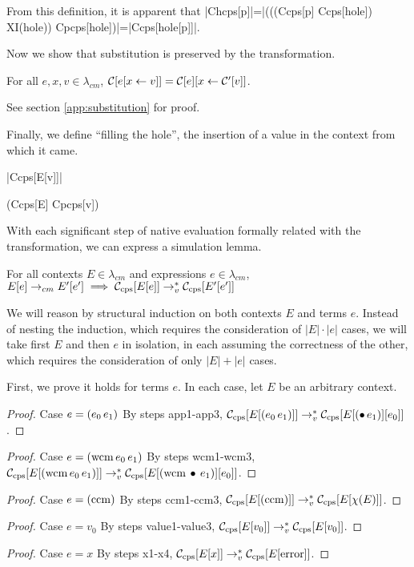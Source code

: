 From this definition, it is apparent that \scheme|Chcps[p]|=\scheme|(((Ccps[p] Ccps[hole]) XI(hole)) Cpcps[hole])|=\scheme|Ccps[hole[p]]|.

Now we show that substitution is preserved by the transformation.

\begin{lemma}[Substitution]
\label{lem:substitution}
For all $e,x,v\in\lambda_{cm}$, $\mathcal{C}[e[x\leftarrow v]]=\mathcal{C}[e][x\leftarrow \mathcal{C}'[v]]$.
\end{lemma}

See section \ref{app:substitution} for proof.

Finally, we define ``filling the hole'', the insertion of a value in the context from which it came.

\begin{schemedefinition}{\scheme|Ccps[E[v]]|}
\begin{schemeblock}
\begin{schemedisplay}
(Ccps[E] Cpcps[v])
\end{schemedisplay}
\end{schemeblock}
\end{schemedefinition}

With each significant step of native evaluation formally related with the transformation, we can express a simulation lemma.

\begin{lemma}[Simulation]
For all contexts $E\in\lambda_{cm}$ and expressions $e\in\lambda_{cm}$, $E[e]\rightarrow_{cm} E'[e']\implies\mathcal{C}_{\mathrm{cps}}[E[e]]\rightarrow_v^{*}\mathcal{C}_{\mathrm{cps}}[E'[e']]$
\end{lemma}

We will reason by structural induction on both contexts $E$ and terms $e$. Instead of
nesting the induction, which requires the consideration of $|E|\cdot|e|$ cases, we will
take first $E$ and then $e$ in isolation, in each assuming the correctness of the other,
which requires the consideration of only $|E|+|e|$ cases.

First, we prove it holds for terms $e$. In each case, let $E$ be an arbitrary context.
\begin{proof}{Case $e=(e_0\,e_1)$}
By steps app1-app3, $\mathcal{C}_{\mathrm{cps}}[E[(e_0\,e_1)]]\rightarrow_v^{*}\mathcal{C}_{\mathrm{cps}}[E[(\bullet\,e_1)][e_0]]$.
\end{proof}
\begin{proof}{Case $e=(\mathrm{wcm}\,e_0\,e_1)$}
By steps wcm1-wcm3, $\mathcal{C}_{\mathrm{cps}}[E[(\mathrm{wcm}\,e_0\,e_1)]]\rightarrow_v^{*}\mathcal{C}_{\mathrm{cps}}[E[(\mathrm{wcm}\,\bullet\,e_1)][e_0]]$.
\end{proof}
\begin{proof}{Case $e=(\mathrm{ccm})$}
By steps ccm1-ccm3, $\mathcal{C}_{\mathrm{cps}}[E[(\mathrm{ccm})]]\rightarrow_v^{*}\mathcal{C}_{\mathrm{cps}}[E[\chi(E)]]$.
\end{proof}
\begin{proof}{Case $e=v_0$}
By steps value1-value3, $\mathcal{C}_{\mathrm{cps}}[E[v_0]]\rightarrow_v^{*}\mathcal{C}_{\mathrm{cps}}[E[v_0]]$.
\end{proof}
\begin{proof}{Case $e=x$}
By steps x1-x4, $\mathcal{C}_{\mathrm{cps}}[E[x]]\rightarrow_v^{*}\mathcal{C}_{\mathrm{cps}}[E[\mathrm{error}]]$.
\end{proof}

